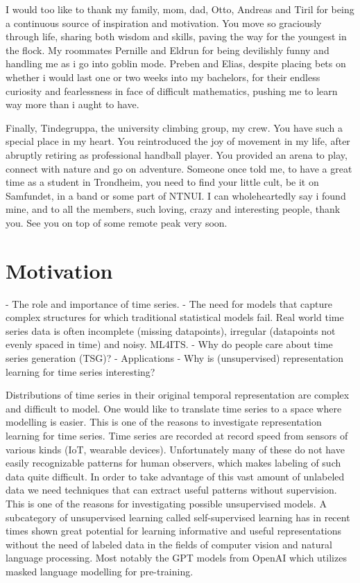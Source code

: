 \documentclass[../../thesis.tex]{subfiles}
\begin{document}
I would too like to thank my family, mom, dad, Otto, Andreas and Tiril for being a continuous source of inspiration and motivation. You move so graciously through life, sharing both wisdom and skills, paving the way for the youngest in the flock. My roommates Pernille and Eldrun for being devilishly funny and handling me as i go into goblin mode. Preben and Elias, despite placing bets on whether i would last one or two weeks into my bachelors, for their endless curiosity and fearlessness in face of difficult mathematics, pushing me to learn way more than i aught to have. \newline

Finally, Tindegruppa, the university climbing group, my crew. You have such a special place in my heart. You reintroduced the joy of movement in my life, after abruptly retiring as professional handball player. You provided an arena to play, connect with nature and go on adventure. Someone once told me, to have a great time as a student in Trondheim, you need to find your little cult, be it on Samfundet, in a band or some part of NTNUI. I can wholeheartedly say i found mine, and to all the members, such loving, crazy and interesting people, thank you. See you on top of some remote peak very soon.

\section{Motivation}

	- The role and importance of time series.
	- The need for models that capture complex structures for which traditional statistical models fail. 
Real world time series data is often incomplete (missing datapoints), irregular (datapoints not evenly spaced in time) and noisy. ML4ITS. 
	- Why do people care about time series generation (TSG)?
		- Applications
	- Why is (unsupervised) representation learning for time series interesting?

Distributions of time series in their original temporal representation are complex and difficult to model. One would like to translate time series to a space where modelling is easier. This is one of the reasons to investigate representation learning for time series. Time series are recorded at record speed from sensors of various kinds (IoT, wearable devices). Unfortunately many of these do not have easily recognizable patterns for human observers, which makes labeling of such data quite difficult. In order to take advantage of this vast amount of unlabeled data we need techniques that can extract useful patterns without supervision. This is one of the reasons for investigating possible unsupervised models. A subcategory of unsupervised learning called self-supervised learning has in recent times shown great potential for learning informative and useful representations without the need of labeled data in the fields of computer vision and natural language processing. Most notably the GPT models from OpenAI which utilizes masked language modelling for pre-training. 
\end{document}
